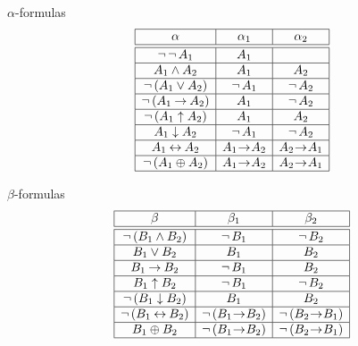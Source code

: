 \documentclass[style=simple,size=12pt]{powerdot}
\begin{document}
\begin{wideslide}[bm=,toc=]{$\alpha$-formulas}
\begin{displaymath}
\begin{array}{|c|c|c|}
\hline
\alpha & \alpha_{1} & \alpha_{2} \\ \hline \hline
\ngg \ngg A_{1} & A_{1} & \\ \hline
A_{1} \wedge A_{2} & A_{1} & A_{2} \\ \hline
\ngg\,(A_{1} \vee A_{2}) & \ngg A_{1} & \ngg A_{2} \\ \hline
\ngg\,(A_{1} \imp A_{2}) & A_{1} & \ngg A_{2} \\ \hline
\ngg\,(A_{1} \uparrow A_{2}) & A_{1} & A_{2} \\ \hline
A_{1} \downarrow A_{2} & \ngg A_{1} & \ngg A_{2} \\ \hline
A_{1} \eqv A_{2}& A_{1} \!\imp\! A_{2} &
A_{2} \!\imp\! A_{1} \\ \hline
\ngg\,(A_{1} \neqv A_{2})& A_{1} \!\imp\! A_{2} &
 A_{2} \!\imp\! A_{1}  \\ \hline
\end{array}
\end{displaymath}
\end{wideslide}

\begin{wideslide}[bm=,toc=]{$\beta$-formulas}
\begin{displaymath}
\begin{array}{|c|c|c|}
\hline
\beta & \beta_{1} & \beta_{2} \\ \hline \hline
\ngg\,(B_{1} \wedge B_{2}) & \ngg B_{1} & \ngg B_{2} \\ \hline
B_{1} \vee B_{2} & B_{1} & B_{2} \\ \hline
B_{1} \imp B_{2} & \ngg B_{1} & B_{2} \\ \hline
B_{1} \uparrow B_{2} & \ngg B_{1} & \ngg B_{2} \\ \hline
\ngg\,(B_{1} \downarrow B_{2}) &  B_{1} & B_{2} \\ \hline
\ngg\,(B_{1} \eqv B_{2})& \ngg\,(B_{1} \!\imp\! B_{2}) &
 \ngg\,(B_{2} \!\imp\! B_{1})  \\ \hline
B_{1} \neqv B_{2}& \ngg\,(B_{1} \!\imp\! B_{2}) &
\ngg\, (B_{2} \!\imp\! B_{1}) \\ \hline
\end{array}
\end{displaymath}
\end{wideslide}
\end{document}
